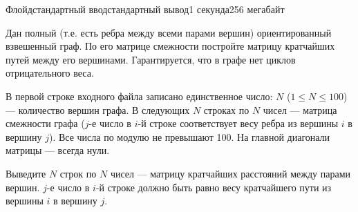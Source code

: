 \begin{problem}{Флойд}{стандартный ввод}{стандартный вывод}{1 секунда}{256 мегабайт}

Дан полный (т.е. есть ребра между всеми парами вершин) ориентированный взвешенный граф. 
По его матрице смежности постройте матрицу кратчайших путей между его вершинами. Гарантируется, что в графе нет циклов отрицательного веса.

\InputFile
В первой строке входного файла записано единственное число: $N$ ($1 \le N \le 100$) --- количество вершин графа. В следующих $N$ строках по $N$ чисел --- матрица смежности графа ($j$-е число в $i$-й строке соответствует весу ребра из вершины $i$ в вершину $j$). Все числа по модулю не превышают 100. На главной диагонали матрицы --- всегда нули. 

\OutputFile
Выведите $N$ строк по $N$ чисел --- матрицу кратчайших расстояний между парами вершин. $j$-е число в $i$-й строке должно быть равно весу кратчайшего пути из вершины $i$ в вершину $j$. 

\Example

\begin{example}
%
\end{example}

\end{problem}

